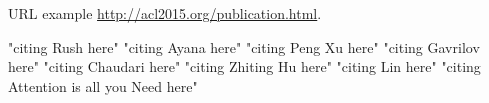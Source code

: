 \documentclass[11pt]{article}
\begin{document}
URL example
\url{http://acl2015.org/publication.html}.

"citing Rush here" \citep{rush2015neural}
"citing Ayana here" \cite{Ayana2017}
"citing Peng Xu here" \cite{DBLP:journals/corr/abs-1902-07110}
"citing Gavrilov here" \cite{DBLP:journals/corr/abs-1901-07786}
"citing Chaudari here" \cite{DBLP:journals/corr/abs-1802-09426}
"citing Zhiting Hu here" \cite{DBLP:journals/corr/HuYLSX17}
"citing Lin here" \cite{lin-2004-rouge}
"citing Attention is all you Need here" \cite{DBLP:journals/corr/VaswaniSPUJGKP17}



\end{document}
